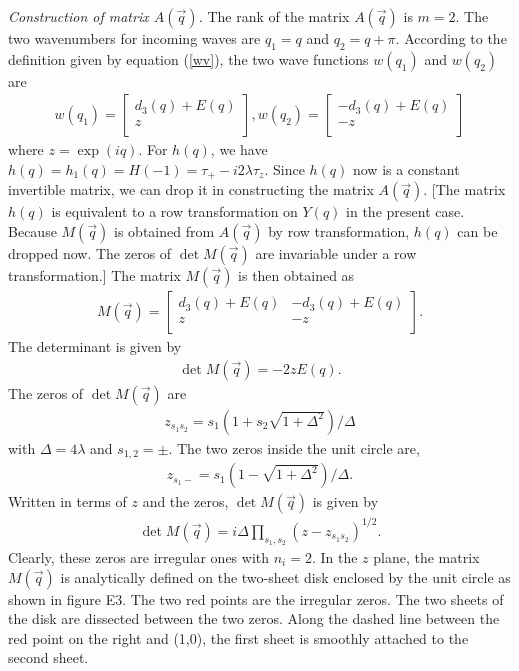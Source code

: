 \documentclass[aps,pra,amsmath,twocolumn,showpacs,bibnotes,10pt]{revtex4-1}
\begin{document}
{\it Construction of matrix $A(\vec q)$.} The rank of the matrix $A(\vec q)$ is $m = 2$. The two wavenumbers for incoming waves are $q_1=q$ and $q_2=q+\pi$. According to the definition given by equation (\ref{wv}), the two wave functions $w(q_1)$ and $w(q_2)$ are
\begin{eqnarray}
w(q_1) = \begin{bmatrix}
	d_3(q)+E(q)\\
	z\\
\end{bmatrix},  
w(q_2) = \begin{bmatrix}
	-d_3(q)+E(q)\\
	-z\\
\end{bmatrix} \nonumber
\end{eqnarray}
where $z = \exp(iq)$. For $h(q)$, we have $h(q) = h_1(q) = H(-1) = \tau_+-i2\lambda\tau_z$. Since $h(q)$ now is a constant invertible matrix, we can drop it in constructing the matrix $A(\vec q)$. [The matrix $h(q)$ is equivalent to a row transformation on $Y(q)$ in the present case. Because $M(\vec q)$ is obtained from $A(\vec q)$ by row transformation, $h(q)$ can be dropped now. The zeros of $\det M(\vec q)$ are invariable under a row transformation.] The matrix $M(\vec q)$ is then obtained as
\begin{eqnarray}
M(\vec q) = \begin{bmatrix}
	d_3(q)+E(q)&-d_3(q)+E(q)\\
	z&-z\\
\end{bmatrix}. \nonumber
\end{eqnarray}
The determinant is given by
\begin{eqnarray}
\det M(\vec q) = -2zE(q).  \label{dtm}
\end{eqnarray}
The zeros of $\det M(\vec q)$ are 
\begin{eqnarray}
z_{s_1s_2} = s_1(1+s_2\sqrt{1+\Delta^2})/\Delta  \nonumber
\end{eqnarray}
with $\Delta = 4\lambda$ and $s_{1,2} = \pm$. The two zeros inside the unit circle are,
\begin{eqnarray}
z_{s_1-} = s_1(1-\sqrt{1+\Delta^2})/\Delta.  \label{zrsd}
\end{eqnarray}
Written in terms of $z$ and the zeros, $\det M(\vec q)$ is given by
\begin{eqnarray}
\det M(\vec q) = i\Delta \prod_{s_1,s_2}(z-z_{s_1s_2})^{1/2}.  \nonumber
\end{eqnarray}
Clearly, these zeros are irregular ones with $n_i = 2$. In the $z$ plane, the matrix $M(\vec q)$ is analytically defined on the two-sheet disk enclosed by the unit circle as shown in figure E3. The two red points are the irregular zeros. The two sheets of the disk are dissected between the two zeros. Along the dashed line between the red point on the right and (1,0), the first sheet is smoothly attached to the second sheet. 
\end{document}

